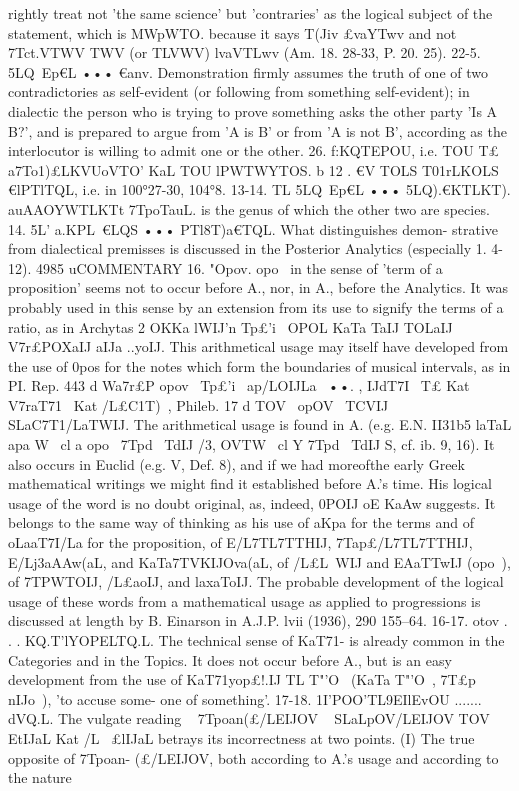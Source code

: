 {{{rightly treat not 'the same science' but 'contraries' as the logical
subject of the statement, which is MWpWTO. because it says T(Jiv
£vaYT{wv and not 7Tct.VTWV TWV (or TLVWV) lvaVTLwv (Am. 18. 28-33,
P.
20. 25).
22-5. 5LQ~Ep€L ••• €anv.
Demonstration firmly assumes the
truth of one of two contradictories as self-evident (or following
from something self-evident); in dialectic the person who is
trying to prove something asks the other party 'Is A B?', and
is prepared to argue from 'A is B' or from 'A is not B', according
as the interlocutor is willing to admit one or the other.
26. f:KQTEPOU, i.e. TOU T£ a7To1)£LKVUoVTO' KaL TOU lPWTWYTOS.
b 12 . €V TOLS T01rLKOLS €lPTlTQL, i.e. in 100°27-30, 104°8.
13-14. TL 5LQ~Ep€L ••• 5LQ).€KTLKT). auAAOYWTLKTt 7TpoTauL. is the
genus of which the other two are species.
14. 5L' a.KPL~€LQS ••• PTl8T)a€TQL. What distinguishes demon-
strative from dialectical premisses is discussed in the Posterior
Analytics (especially 1. 4-12).
4985
uCOMMENTARY
16. "Opov. opo~ in the sense of 'term of a proposition' seems not
to occur before A., nor, in A., before the Analytics. It was
probably used in this sense by an extension from its use to
signify the terms of a ratio, as in Archytas 2 OKKa lWIJ'n Tp£'i~ OPOL
KaTa TaIJ TOLaIJ V7r£POXaIJ aIJa ..\6yoIJ. This arithmetical usage may
itself have developed from the use of 0pos for the notes which
form the boundaries of musical intervals, as in PI. Rep. 443 d
Wa7r£P opov~ Tp£'i~ ap/LOIJLa~ ••. , IJdT7I~ T£ Kat V7raT71~ Kat /L£C1T)~,
Phileb. 17 d TOV~ opOV~ TCVIJ SLaC7T1}/LaTWIJ. The arithmetical usage
is found in A. (e.g. E.N. II31b5 laTaL apa W~ cl a opo~ 7Tpd~ TdIJ
/3, OVTW~ cl Y 7Tpd~ TdIJ S, cf. ib. 9, 16). It also occurs in Euclid
(e.g. V, Def. 8), and if we had moreofthe early Greek mathematical
writings we might find it established before A.'s time. His logical
usage of the word is no doubt original, as, indeed, 0POIJ oE KaAw
suggests. It belongs to the same way of thinking as his use of
aKpa for the terms and of oLaaT7I/La for the proposition, of E/L7TL7TTHIJ,
7Tap£/L7TL7TTHIJ, E/Lj3aAAw(}aL, and KaTa7TVKIJOva(}aL, of /L£L~WIJ and
EAaTTwIJ (opo~), of 7TPWTOIJ, /L£aoIJ, and laxaToIJ.
The probable development of the logical usage of these
words from a mathematical usage as applied to progressions
is discussed at length by B. Einarson in A.J.P. lvii (1936),
290
155--64.
16-17. otov . . . KQ.T'lYOPELTQ.L. The technical sense of KaT71-
is already common in the Categories and in the Topics.
It does not occur before A., but is an easy development from the
use of KaT71yop£!.IJ TL T"'O~ (KaTa T"'O~, 7T£p{ nIJo~), 'to accuse some-
one of something'.
17-18. 1I'POO'TL9EIlEvOU ....... ~ dVQ.L. The vulgate reading ~
7Tpoan(}£/LEIJOV ~ SLaLpOV/LEIJOV TOV EtIJaL Kat /L~ £lIJaL betrays its
incorrectness at two points. (I) The true opposite of 7Tpoan-
(}£/LEIJOV, both according to A.'s usage and according to the nature
